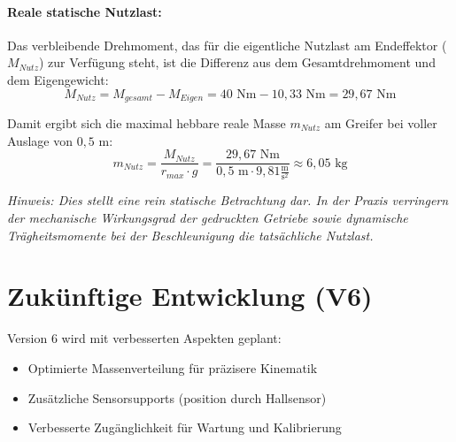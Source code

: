 \paragraph{Reale statische Nutzlast:}
Das verbleibende Drehmoment, das für die eigentliche Nutzlast am Endeffektor ($M_{Nutz}$) zur Verfügung steht, ist die Differenz aus dem Gesamtdrehmoment und dem Eigengewicht:
$$M_{Nutz} = M_{gesamt} - M_{Eigen} = 40\text{ Nm} - 10,33\text{ Nm} = 29,67\text{ Nm}$$

Damit ergibt sich die maximal hebbare reale Masse $m_{Nutz}$ am Greifer bei voller Auslage von $0,5\text{ m}$:
$$m_{Nutz} = \frac{M_{Nutz}}{r_{max} \cdot g} = \frac{29,67\text{ Nm}}{0,5\text{ m} \cdot 9,81\frac{\text{m}}{\text{s}^2}} \approx 6,05\text{ kg}$$

\textit{Hinweis: Dies stellt eine rein statische Betrachtung dar. In der Praxis verringern der mechanische Wirkungsgrad der gedruckten Getriebe sowie dynamische Trägheitsmomente bei der Beschleunigung die tatsächliche Nutzlast.}

\section{Zukünftige Entwicklung (V6)}

Version 6 wird mit verbesserten Aspekten geplant:

\begin{itemize}
	\item Optimierte Massenverteilung für präzisere Kinematik
	\item Zusätzliche Sensorsupports (position durch Hallsensor)
	\item Verbesserte Zugänglichkeit für Wartung und Kalibrierung
\end{itemize}


